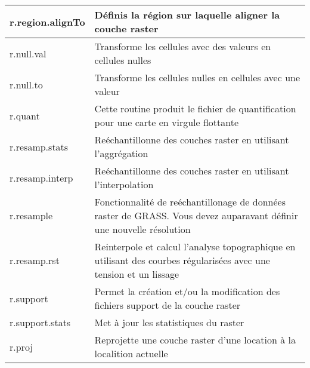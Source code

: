 \begin{table}[ht]
\begin{tabular}{|p{4cm}|p{12cm}|}
  \hline r.region.alignTo & D\'efinis la r\'egion sur laquelle aligner la couche raster \\
  \hline r.null.val & Transforme les cellules avec des valeurs en cellules nulles\\
  \hline r.null.to & Transforme les cellules nulles en cellules avec une valeur\\
  \hline r.quant & Cette routine produit le fichier de quantification pour une carte en virgule flottante \\
  \hline r.resamp.stats & Re\'echantillonne des couches raster en utilisant l'aggr\'egation \\
  \hline r.resamp.interp & Re\'echantillonne des couches raster en utilisant l'interpolation \\
  \hline r.resample & Fonctionnalit\'e de re\'echantillonage de donn\'ees raster de GRASS. Vous devez auparavant d\'efinir une nouvelle r\'esolution \\
  \hline r.resamp.rst & Reinterpole et calcul l'analyse topographique en utilisant des courbes r\'egularis\'ees avec une tension et un lissage \\
  \hline r.support & Permet la cr\'eation et/ou la modification des fichiers support de la couche raster\\
  \hline r.support.stats & Met \`a jour les statistiques du raster \\
  \hline r.proj & Reprojette une couche raster d'une location \`a la localition actuelle \\
\hline
\end{tabular}
\end{table}

